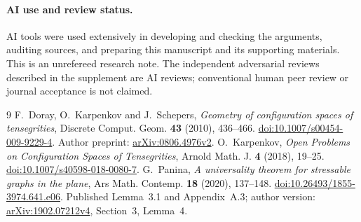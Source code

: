 \documentclass[11pt]{article}
\begin{document}
\paragraph{AI use and review status.}
AI tools were used extensively in developing and checking the arguments,
auditing sources, and preparing this manuscript and its supporting materials.
This is an unrefereed research note. The independent adversarial reviews
described in the supplement are AI reviews; conventional human peer review
or journal acceptance is not claimed.

\begin{thebibliography}{9}
 F.~Doray, O.~Karpenkov and J.~Schepers,
\emph{Geometry of configuration spaces of tensegrities},
Discrete Comput. Geom. \textbf{43} (2010), 436--466.
\href{https://doi.org/10.1007/s00454-009-9229-4}{doi:10.1007/s00454-009-9229-4}.
Author preprint: \href{https://arxiv.org/abs/0806.4976v2}{arXiv:0806.4976v2}.
 O.~Karpenkov,
\emph{Open Problems on Configuration Spaces of Tensegrities},
Arnold Math. J. \textbf{4} (2018), 19--25.
\href{https://doi.org/10.1007/s40598-018-0080-7}{doi:10.1007/s40598-018-0080-7}.
 G.~Panina,
\emph{A universality theorem for stressable graphs in the plane},
Ars Math. Contemp. \textbf{18} (2020), 137--148.
\href{https://doi.org/10.26493/1855-3974.641.e06}{doi:10.26493/1855-3974.641.e06}.
Published Lemma~3.1 and Appendix~A.3; author version: \href{https://arxiv.org/abs/1902.07212v4}{arXiv:1902.07212v4},
Section~3, Lemma~4.
\end{thebibliography}
\end{document}
